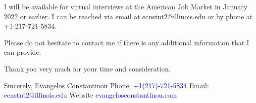 \documentclass[12pt]{letter}
\begin{document}
\begin{letter}{}





I will be available for virtual interviews at the American Job Market in January 2022 or earlier.
I can be reached via email at ecnstnt2@illinois.edu or by phone at +1-217-721-5834.

Please do not hesitate to contact me if there is any additional information that I can provide.

Thank you very much for your time and consideration.


\noindent Sincerely,
\newline\noindent Evangelos Constantinou
\vspace{4mm}
\newline\noindent Phone: \textcolor{blue}{+1(217)-721-5834}
\newline\noindent Email: \textcolor{blue}{ecnstnt2@illinois.edu}
\newline\noindent Website \textcolor{blue}{evangelosconstantinou.com}
\end{letter}
\end{document}

